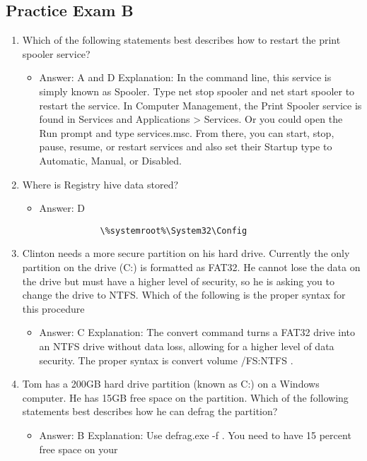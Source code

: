 \documentclass{article}
\begin{document}
\subsection{Practice Exam B}
\begin{enumerate}
    \item Which of the following statements best describes how to restart the print spooler service? 
    \begin{itemize}
        \item Answer: A and D Explanation: In the command line, this service is simply known as Spooler. Type net
stop spooler and net start spooler to restart the service. In Computer
Management, the Print Spooler service is found in Services and Applications >
Services. Or you could open the Run prompt and type services.msc. From there,
you can start, stop, pause, resume, or restart services and also set their Startup type
to Automatic, Manual, or Disabled.
    \end{itemize}
    \item Where is Registry hive data stored? 
    \begin{itemize}
        \item Answer: D
        \begin{lstlisting}
            \%systemroot%\System32\Config
        \end{lstlisting}
    \end{itemize}
    \item Clinton needs a more secure partition on his hard drive. Currently the only partition on the drive (C:) is formatted as FAT32. He cannot lose the data on the drive but must have a higher level of security, so he is asking you to change the drive to NTFS. Which of the following is the proper syntax for this procedure
    \begin{itemize}
        \item Answer: C
Explanation: The convert command turns a FAT32 drive into an NTFS drive without
data loss, allowing for a higher level of data security. The proper syntax is convert
volume /FS:NTFS .
    \end{itemize}
    \item Tom has a 200GB hard drive partition (known as C:) on a Windows computer. He has 15GB free space on the partition. Which of the following statements best describes how he can defrag the
    partition? 
    \begin{itemize}
        \item Answer: B
Explanation: Use defrag.exe -f . You need to have 15 percent free space on your

\end{itemize}
\end{enumerate}
\end{document}
